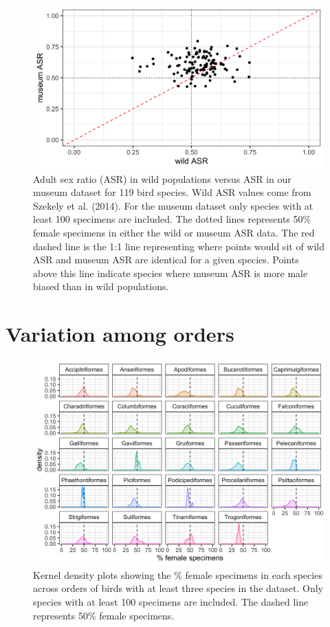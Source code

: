 \documentclass[a4paper, 12pt]{article}
\begin{document}
\begin{figure}[H]
 \centering
  \includegraphics[width = \linewidth]{figures/wild-sex-ratios.png}
  \caption{Adult sex ratio (ASR) in wild populations versus ASR in our museum dataset for 119 bird species. 
  Wild ASR values come from Szekely et al. (2014)\cite{szekely2014sex}. 
  For the museum dataset only species with at least 100 specimens are included. 
  The dotted lines represents 50\% female specimens in either the wild or museum ASR data. 
  The red dashed line is the 1:1 line representing where points would sit of wild ASR and museum ASR are identical for a given species.
  Points above this line indicate species where museum ASR is more male biased than in wild populations.
}
  \label{fig-asr}
\end{figure}

\newpage
\section{Variation among orders}

\begin{figure}[H]
 \centering
  \includegraphics[width = \linewidth]{figures/orders-density-birds-all.png}
  \caption{Kernel density plots showing the \% female specimens in each species across orders of birds with at least three species in the dataset. 
  Only species with at least 100 specimens are included. 
  The dashed line represents 50\% female specimens.}
  \label{fig-bird-orders}
\end{figure}
\end{document}
